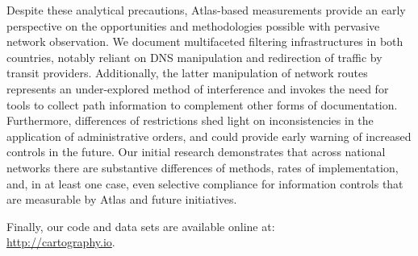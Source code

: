 Despite these analytical precautions, Atlas-based measurements provide
an early perspective on the opportunities and methodologies possible
with pervasive network observation. We document multifaceted filtering
infrastructures in both countries, notably reliant on DNS manipulation
and redirection of traffic by transit providers. Additionally, the
latter manipulation of network routes represents an under-explored method
of interference and invokes the need for tools to collect path
information to complement other forms of documentation. Furthermore,
differences of restrictions shed light on  inconsistencies in the
application of administrative orders, and could provide early warning of
increased controls in the future. Our initial research demonstrates that
across national networks there are substantive differences of methods,
rates of implementation, and, in at least one case, even selective
compliance for information controls that are measurable by Atlas and
future initiatives.

Finally, our code and data sets are available online at: \\
\url{http://cartography.io}.
